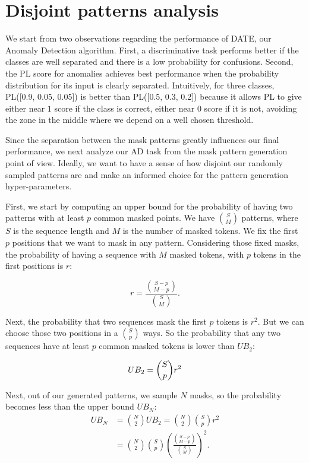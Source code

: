 \documentclass[11pt]{article}
\begin{document}
\section{Disjoint patterns analysis}
\label{apx:disjoint_patterns}
We start from two observations regarding the performance of DATE, our Anomaly Detection algorithm. First, a discriminative task performs better if the classes are well separated \cite{Deng2012} and there is a low probability for confusions. Second, the PL score for anomalies achieves best performance when the probability distribution for its input is clearly separated. Intuitively, for three classes, PL([0.9, 0.05, 0.05]) is better than PL([0.5, 0.3, 0.2]) because it allows PL to give either near $1$ score if the class is correct, either near $0$ score if it is not, avoiding the zone in the middle where we depend on a well chosen threshold.

Since the separation between the mask patterns greatly influences our final performance, we next analyze our AD task from the mask pattern generation point of view. Ideally, we want to have a sense of how disjoint our randomly sampled patterns are and make an informed choice for the pattern generation hyper-parameters.

First, we start by computing an upper bound for the probability of having two patterns with at least $p$ common masked points. We have $\binom{S}{M}$ patterns, where $S$ is the sequence length and $M$ is the number of masked tokens. We fix the first $p$ positions that we want to mask in any pattern. Considering those fixed masks, the probability of having a sequence with $M$ masked tokens, with $p$ tokens in the first positions is $r$:

\begin{equation}
\label{eq: r_ratio}
    r = \frac{\binom{S-p}{M-p}}{\binom{S}{M}}.
\end{equation}

Next, the probability that two sequences mask the first $p$ tokens is $r^2$. But we can choose those two positions in a $\binom{S}{p}$ ways. So the probability that any two sequences have at least $p$ common masked tokens is lower than $UB_{2}$:

\begin{equation}
\label{eq: concide_bound}
    UB_{2} = \binom{S}{p} r^2\\
\end{equation}

Next, out of our generated patterns, we sample $N$ masks, so the probability becomes less than the upper bound $UB_{N}$:
\begin{equation}
\label{eq: final_bound}
    \begin{aligned}
    UB_{N} &= \binom{N}{2} UB_{2} = \binom{N}{2} \binom{S}{p} r^2 \\ 
        &= \binom{N}{2} \binom{S}{p} (\frac{\binom{S-p}{M-p}}{\binom{S}{M}})^2.
    \end{aligned}
\end{equation}
\end{document}
